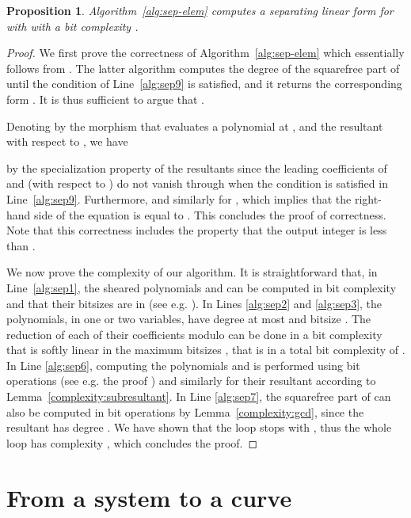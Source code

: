 \documentclass{sig-alternate}
\newtheorem{proposition}[theorem]{Proposition}
\newcommand{\blue}[1]{\color{blue}#1\color{black}\xspace}
\renewcommand{\blue}[1]{#1\xspace}
\begin{document}
\begin{proposition}\label{prop:sep-elem-comp}
Algorithm~\ref{alg:sep-elem}  computes a separating linear form  for  with
 with a bit complexity  . 
\end{proposition}


\begin{proof}
We first prove the correctness of Algorithm~\ref{alg:sep-elem}  which essentially follows from 
\blue{\cite[Algorithm~4]{bouzidiJSC2014a}}. The latter algorithm computes the degree of the
squarefree part of  until the condition of Line~\ref{alg:sep9} is satisfied, and
it returns the corresponding form .
It is thus sufficient to argue that . 

Denoting by  the morphism that evaluates a polynomial at , and  the
resultant with respect to , we have 

by the specialization property of the resultants 
since the leading coefficients of  and  (with respect to ) do not vanish through
 when the condition  is
satisfied in  Line~\ref{alg:sep9}. Furthermore,  and similarly for , which
implies that the right-hand side  of the equation is equal to . This concludes the proof
of correctness. Note that this correctness includes the property that the output
integer  is less than .




We now prove the complexity of our algorithm. 
It is
straightforward that,  in Line~\ref{alg:sep1}, the sheared polynomials  and
 can be computed  in bit complexity
 and that their bitsizes are in  (see e.g. \blue{\cite[Lemma 7]{bouzidiJSC2014a}}). In Lines \ref{alg:sep2} and \ref{alg:sep3}, the polynomials, in one or two variables, have degree at most  and bitsize . The reduction of each of their  coefficients modulo  can be done in a bit complexity that is softly linear in the
 maximum bitsizes \cite[Thm. 9.8]{vzGGer2}, that is  in a total bit complexity of . 
In Line  \ref{alg:sep6}, computing the polynomials  and  is performed using
 bit operations (see e.g. the proof \blue{\cite[Lemma 7]{bouzidiJSC2014a}}) and similarly for their resultant  according to
Lemma~\ref{complexity:subresultant}. 
In Line  \ref{alg:sep7}, the squarefree part of  can also be computed in 
bit operations by Lemma~\ref{complexity:gcd}, since the resultant has degree .
We have shown that the loop stops with , thus the whole  loop has complexity
, which concludes the proof.
\end{proof}


\section{From a system to a curve}\label{sec:PQ_curve}
\end{document}
